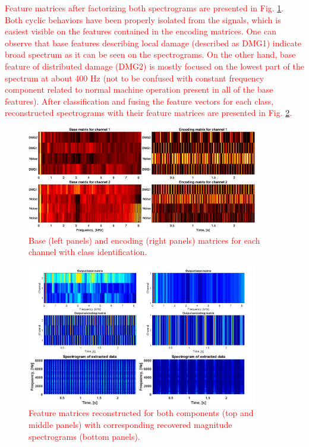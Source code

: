 \documentclass[3p,12pt]{elsarticle}
\begin{document}
\textcolor{red}{Feature matrices after factorizing both spectrograms are presented in Fig. \ref{fig:NMF_matrix2}. Both cyclic behaviors have been properly isolated from the signals, which is easiest visible on the features contained in the encoding matrices. One can observe that base features describing local damage (described as DMG1) indicate broad spectrum as it can be seen on the spectrograms. On the other hand, base feature of distributed damage (DMG2) is mostly focused on the lowest part of the spectrum at about 400 Hz (not to be confused with constant frequency component related to normal machine operation present in all of the base features). After classification and fusing the feature vectors for each class, reconstructed spectrograms with their feature matrices are presented in Fig. \ref{fig:NMF_result2}.} 

\begin{figure}[ht!]
\centering
\includegraphics[width=0.9\textwidth]{figs/mats4.eps}
\caption{\textcolor{red}{Base (left panels) and encoding (right panels) matrices for each channel with class identification.}}
\label{fig:NMF_matrix2}
\end{figure}

\begin{figure}[ht!]
\centering
\includegraphics[width=0.9\textwidth]{figs/feat2.png}
\caption{\textcolor{red}{Feature matrices reconstructed for both components (top and middle panels) with corresponding recovered magnitude spectrograms (bottom panels).}}
\label{fig:NMF_result2}
\end{figure}
\end{document}
